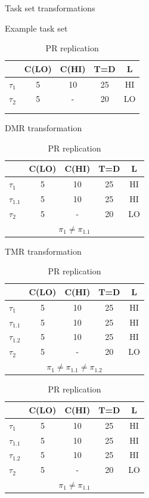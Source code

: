 \documentclass[conference]{IEEEtran}
\begin{document}
	
\begin{table}
\centering
\caption{Task set transformations}
\label{t:transform}
	\begin{subtable}{0.3\textwidth}
	\centering
		\caption{Example task set}
		\begin{tabular}{@{}l|cccc@{}}
		\toprule
		& C(LO) & C(HI) & T=D & L 	 \\\bottomrule
		$\tau_1$ & 5 & 10 & 25 & HI  \\
		$\tau_2$ & 5 & - & 20 & LO  \\
		\multicolumn{5}{c}{ } \\
		\multicolumn{5}{c}{ } \\
		\end{tabular}
	\end{subtable} 
	\begin{subtable}{0.3\textwidth}
	\centering
		\caption{DMR transformation}
		\begin{tabular}{@{}l|cccc@{}}
		\toprule
				& C(LO) & C(HI) & T=D & L	 \\\bottomrule
		$\tau_1$ & 5 & 10 & 25 & HI  \\
		$\tau_{1.1}$ & 5 & 10 & 25 & HI  \\
		$\tau_2$ & 5 & - & 20 & LO  \\
		\multicolumn{5}{c}{$\pi_1 \ne \pi_{1.1}$}
		\end{tabular}
	\end{subtable}
	\vfil
	\begin{subtable}{0.3\textwidth}
		\caption{TMR transformation}
		\begin{tabular}{@{}l|cccc@{}}
		\toprule
				& C(LO) & C(HI) & T=D & L	 \\\bottomrule
		$\tau_1$ & 5 & 10 & 25 & HI  \\
		$\tau_{1.1}$ & 5 & 10 & 25 & HI  \\
		$\tau_{1.2}$ & 5 & 10 & 25 & HI  \\
		$\tau_2$ & 5 & - & 20 & LO  \\
		\multicolumn{5}{c}{$\pi_1 \ne \pi_{1.1} \ne \pi_{1.2}$}
		\end{tabular}
	\end{subtable} 
	\begin{subtable}{0.3\textwidth}
		\caption{PR replication}
		\begin{tabular}{@{}l|cccc@{}}
		\toprule
		& C(LO) & C(HI) & T=D & L	 \\\bottomrule
		$\tau_1$ & 5 & 10 & 25 & HI  \\
		$\tau_{1.1}$ & 5 & 10 & 25 & HI  \\
		$\tau_{1.2}$ & 5 & 10 & 25 & HI  \\
		$\tau_2$ & 5 & - & 20 & LO  \\
		\multicolumn{5}{c}{$\pi_1 \ne \pi_{1.1}$}
		\end{tabular}
	\end{subtable}
\end{table}
\end{document}
